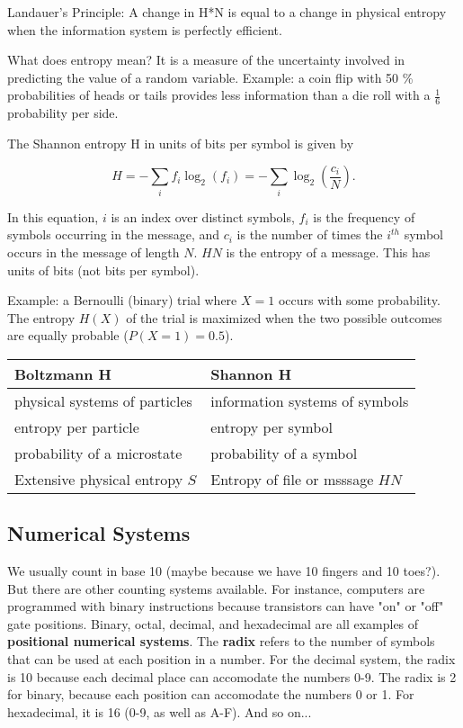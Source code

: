 Landauer's Principle: A change in H*N is equal to a change in physical entropy when the information system is perfectly efficient. 

What does entropy mean? It is a measure of the uncertainty involved in predicting the value of a random variable. Example: a coin flip with 50 \% probabilities of heads or tails provides less information than a die roll with a $\frac{1}{6}$ probability per side. 

The Shannon entropy H in units of bits per symbol is given by

\begin{equation}
H = - \sum_{i} f_{i} \log_{2} (f_{i}) = - \sum_{i} \log_{2} (\frac{c_{i}}{N}).
\end{equation}

In this equation, $i$ is an index over distinct symbols, $f_{i}$ is the frequency of symbols occurring in the message, and $c_{i}$ is the number of times the $i^{th}$ symbol occurs in the message of length $N$. $H N$ is the entropy of a message. This has units of bits (not bits per symbol). 

Example: a Bernoulli (binary) trial where $X=1$ occurs with some probability. The entropy $H(X)$ of the trial is maximized when the two possible outcomes are equally probable ($P(X=1) = 0.5$).

\begin{tabular}{l | l}
\textbf{Boltzmann H} & \textbf{Shannon H} \\
\hline
physical systems of particles & information systems of symbols \\
entropy per particle & entropy per symbol \\
probability of a microstate & probability of a symbol \\
Extensive physical entropy $S$ & Entropy of file or msssage $HN$ \\
\end{tabular}

\subsection{Numerical Systems}

We usually count in base 10 (maybe because we have 10 fingers and 10 toes?). But there are other counting systems available. For instance, computers are programmed with binary instructions because transistors can have "on" or "off" gate positions. Binary, octal, decimal, and hexadecimal are all examples of \textbf{positional numerical systems}. The \textbf{radix} refers to the number of symbols that can be used at each position in a number. For the decimal system, the radix is 10 because each decimal place can accomodate the numbers 0-9. The radix is 2 for binary, because each position can accomodate the numbers 0 or 1. For hexadecimal, it is 16 (0-9, as well as A-F). And so on... 

